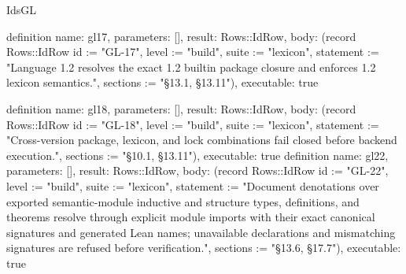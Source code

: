 \begin{lexlean}{IdsGL}
\begin{semanticmodule}
definition{
  name: gl17,
  parameters: [],
  result: Rows::IdRow,
  body: (record Rows::IdRow {id := "GL-17", level := "build", suite := "lexicon", statement := "Language 1.2 resolves the exact 1.2 builtin package closure and enforces 1.2 lexicon semantics.", sections := "§13.1, §13.11"}),
  executable: true
}

definition{
  name: gl18,
  parameters: [],
  result: Rows::IdRow,
  body: (record Rows::IdRow {id := "GL-18", level := "build", suite := "lexicon", statement := "Cross-version package, lexicon, and lock combinations fail closed before backend execution.", sections := "§10.1, §13.11"}),
  executable: true
}
definition{
  name: gl22,
  parameters: [],
  result: Rows::IdRow,
  body: (record Rows::IdRow {id := "GL-22", level := "build", suite := "lexicon", statement := "Document denotations over exported semantic-module inductive and structure types, definitions, and theorems resolve through explicit module imports with their exact canonical signatures and generated Lean names; unavailable declarations and mismatching signatures are refused before verification.", sections := "§13.6, §17.7"}),
  executable: true
}
\end{semanticmodule}
\end{lexlean}
